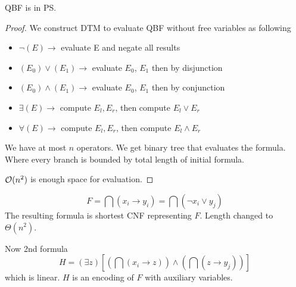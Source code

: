 \begin{theorem}
	QBF is in PS.
\end{theorem}
\begin{proof}
	We construct DTM to evaluate QBF without free variables as following
	\begin{itemize}
		\item $\neg(E) \to$ evaluate E and negate all results
		\item $(E_0) \lor (E_1) \to $ evaluate $E_0$, $E_1$ then by disjunction
		\item $(E_0) \land (E_1) \to $ evaluate $E_0$, $E_1$ then by conjunction
		\item $\exists (E) \to$ compute $E_l, E_r$, then compute $E_l \lor E_r$
		\item $\forall(E) \to$ compute $E_l, E_r$, then compute $E_l \land E_r$
	\end{itemize}

	We have at most $n$ operators.
	We get binary tree that evaluates the formula.
	Where every branch is bounded by total length of initial formula.

	$\mathcal{O}(n^2)$ is enough space for evaluation.
\end{proof}

\begin{note}
	\[ F = \bigcap (x_i \to y_i) = \bigcap (\neg x_i \lor y_j)\]
	The resulting formula is shortest CNF representing $F$.
	Length changed to $\Theta(n^2)$.

	Now 2nd formula
	\[ H = (\exists z) [(\bigcap(x_i \to z)) \land (\bigcap (z \to y_j))] \]
	which is linear. $H$ is an encoding of $F$ with auxiliary variables.
\end{note}

